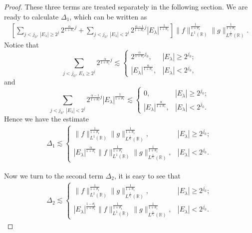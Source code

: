 \documentclass[10pt,a4paper]{amsart}
\begin{document}
\begin{proof}
These three terms are treated separately in the following section. We are ready to calculate $\Delta_{1}$, which can be written as
\begin{align*}
\left[\sum\limits_{j<j_{0},~{|E_{\lambda}|\geq2^j}}2^{{\frac{\alpha}{1+\theta_{1}}}j}+
\sum\limits_{j<j_{0},~{|E_{\lambda}|<2^j}}2^{{\frac{\alpha-1}{1+\theta_{1}}}j}|E_\lambda|^{\frac{1}{1+\theta_{1}}}\right]
\|f\|_{L^{1}(\mathbb{R})}^{\frac{1}{1+\theta_{1}}}\|g\|_{L^{\frac{1}{\theta_1}}(\mathbb{R})}^{\frac{1}{1+\theta_{1}}}.
\end{align*}
Notice that
$$\sum\limits_{j<j_{0},~{E_{\lambda}\geq2^j}}2^{{\frac{\alpha}{1+\theta_{1}}}j}\lesssim
\begin{cases}
 2^{{\frac{\alpha}{1+\theta_{1}}}{j_0}} , & |E_\lambda|\geq2^{j_0}; \\
  |E_\lambda|^{\frac{\alpha}{1+\theta_{1}}}, & |E_\lambda|<2^{j_0},
\end{cases}$$
and
$$\sum\limits_{j<j_{0},~{|E_{\lambda}|<2^j}}2^{{\frac{\alpha-1}{1+\theta_{1}}}j}|E_\lambda|^{\frac{1}{1+\theta_{1}}}\lesssim
\begin{cases}
 0, & |E_\lambda|\geq2^{j_0}; \\
  |E_\lambda|^{\frac{\alpha}{1+\theta_{1}}}, & |E_\lambda|<2^{j_0}.
\end{cases}$$
Hence we have the estimate
\begin{align}\label{eq:4.9}
\Delta_{1}\lesssim
\begin{cases}
  \|f\|_{L^{1}(\mathbb{R})}^{\frac{1}{1+\theta_{1}}}\|g\|_{L^{\frac{1}{\theta_1}}(\mathbb{R})}^{\frac{1}{1+\theta_{1}}}, & |E_\lambda|\geq2^{j_0}; \\
  |E_\lambda|^{\frac{\alpha}{1+\theta_{1}}}\|f\|_{L^{1}(\mathbb{R})}^{\frac{1}{1+\theta_{1}}}\|g\|_{L^{\frac{1}{\theta_1}}(\mathbb{R})}^{\frac{1}{1+\theta_{1}}}, & |E_\lambda|<2^{j_0}.
\end{cases}
\end{align}

Now we turn to the second term $\Delta_{2}$, it is easy to see that
\begin{align}\label{eq:4.10}
\Delta_{2}\lesssim
\begin{cases}
   \|f\|_{L^{1}(\mathbb{R})}^{\frac{1}{1+\theta_{1}}}\|g\|_{L^{\frac{1}{\theta_1}}(\mathbb{R})}^{\frac{1}{1+\theta_{1}}}, &  |E_\lambda|\geq2^{j_0}; \\
   |E_\lambda|^{\frac{1-\theta_{1}}{1+\theta_{1}}}\|f\|_{L^{1}(\mathbb{R})}^{\frac{1}{1+\theta_{1}}}\|g\|_{L^{\frac{1}{\theta_1}}(\mathbb{R})}^{\frac{1}{1+\theta_{1}}}, & |E_\lambda|<2^{j_0}.
 \end{cases}
\end{align}


\end{proof}
\end{document}
